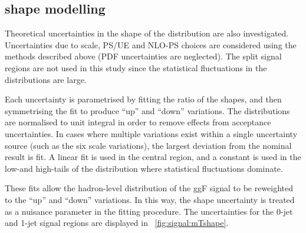 


\newpage
\subsection{\mt shape modelling}
\label{sec:ggF:mt}

Theoretical uncertainties in the shape of the \mt distribution are also investigated. 
Uncertainties due to scale, PS/UE and NLO-PS choices are considered using the methods 
described above (PDF uncertainties are neglected). The split signal regions are not used in 
this study since the statistical fluctuations in the \mt distributions are large.

Each uncertainty is parametrised by fitting the ratio of the \mt shapes, and then 
symmetrising the fit to produce ``up'' and ``down'' variations. The \mt distributions are 
normalised to unit integral in order to remove effects from acceptance uncertainties. 
In cases where multiple variations exist within a single uncertainty source (such as the 
six scale variations), the largest deviation from the nominal result is fit. A linear 
fit is used in the central \mt region, and a constant is used in the low-\mt and 
high-\mt tails of the distribution where statistical fluctuations dominate.

These fits allow the hadron-level \mt distribution of the ggF signal to be reweighted 
to the ``up'' and ``down'' variations. In this way, the \mt shape uncertainty is treated 
as a nuisance parameter in the \HWW fitting procedure. The uncertainties for the 0-jet 
and 1-jet signal regions are displayed in \Figure~\ref{fig:signal:mTshape}.

